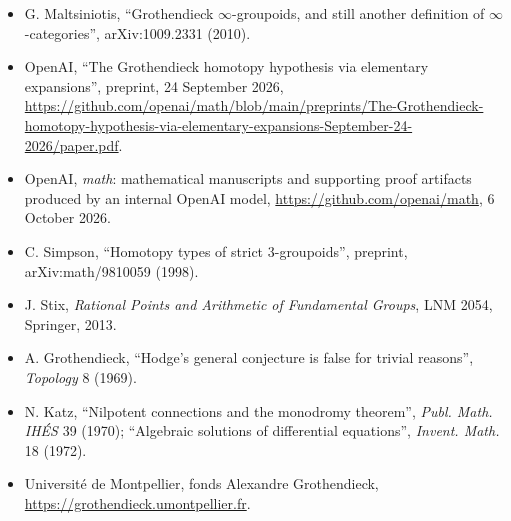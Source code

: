 \documentclass[11pt,a4paper]{article}
\newcommand{\q}[1]{“#1”}
\begin{document}
\begin{itemize}[leftmargin=*]
\item G. Maltsiniotis, \q{Grothendieck $\infty$-groupoids, and still another definition of $\infty$-categories}, arXiv:1009.2331 (2010).
\item OpenAI, \q{The Grothendieck homotopy hypothesis via elementary expansions}, preprint, 24 September 2026, \url{https://github.com/openai/math/blob/main/preprints/The-Grothendieck-homotopy-hypothesis-via-elementary-expansions-September-24-2026/paper.pdf}.
\item OpenAI, \emph{math}: mathematical manuscripts and supporting proof artifacts produced by an internal OpenAI model, \url{https://github.com/openai/math}, 6 October 2026.
\item C. Simpson, \q{Homotopy types of strict 3-groupoids}, preprint, arXiv:math/9810059 (1998).
\item J. Stix, \emph{Rational Points and Arithmetic of Fundamental Groups}, LNM 2054, Springer, 2013.
\item A. Grothendieck, \q{Hodge's general conjecture is false for trivial reasons}, \emph{Topology} 8 (1969).
\item N. Katz, \q{Nilpotent connections and the monodromy theorem}, \emph{Publ. Math. IHÉS} 39 (1970); \q{Algebraic solutions of differential equations}, \emph{Invent. Math.} 18 (1972).
\item Université de Montpellier, fonds Alexandre Grothendieck, \url{https://grothendieck.umontpellier.fr}.
\end{itemize}
\end{document}
